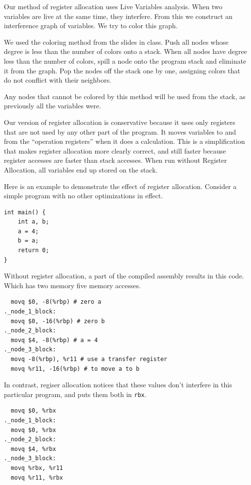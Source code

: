\documentclass[11pt]{article}
\begin{document}
  Our method of register allocation uses Live Variables analysis. When two variables are live at the same 
  time, they interfere. From this we construct an interference graph of variables. We try to color this graph.

  We used the coloring method from the slides in class. Push all nodes whose degree is less than the number of colors onto a stack.
  When all nodes have degree less than the number of colors, spill a node onto the program stack and eliminate it from the graph.
  Pop the nodes off the stack one by one, assigning colors that do not conflict with their neighbors.

  Any nodes that cannot be colored by this method will be used from the stack, as previously all the variables
  were.

  Our version of register allocation is conservative because it uses only registers that are not used by
  any other part of the program. It moves variables to and from the ``operation registers'' when it does a
  calculation. This is a simplification that makes register allocation more clearly correct, and still faster
  because register accesses are faster than stack accesses.
  When run without Register Allocation, all variables end up stored on the stack.

  Here is an example to demonstrate the effect of register allocation.
  Consider a simple program with no other optimizations in effect.

\begin{verbatim}
int main() {
    int a, b;
    a = 4;
    b = a;
    return 0;
}
\end{verbatim}



  Without register allocation, a part of the compiled assembly results in this code.
  Which has two memory five memory accesses.

\begin{verbatim}
  movq $0, -8(%rbp) # zero a
._node_1_block:
  movq $0, -16(%rbp) # zero b
._node_2_block:
  movq $4, -8(%rbp) # a = 4
._node_3_block:
  movq -8(%rbp), %r11 # use a transfer register
  movq %r11, -16(%rbp) # to move a to b
\end{verbatim}



  In contrast, regiser allocation notices that these values don't interfere in this particular program,
  and puts them both in \texttt{rbx}.

\begin{verbatim}
  movq $0, %rbx
._node_1_block:
  movq $0, %rbx
._node_2_block:
  movq $4, %rbx
._node_3_block:
  movq %rbx, %r11
  movq %r11, %rbx
\end{verbatim}
\end{document}
